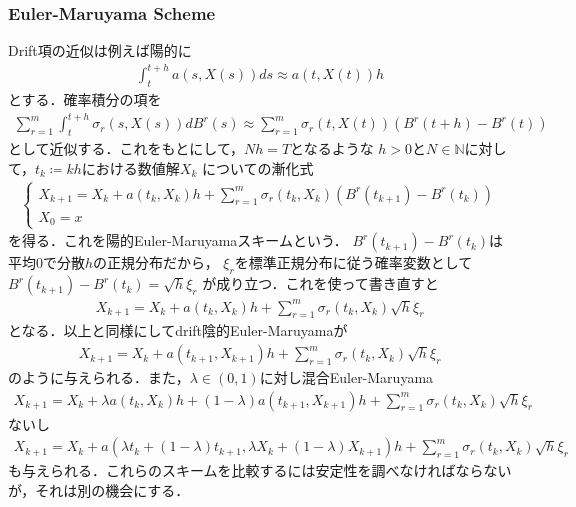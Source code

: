 \documentclass[dvipdfmx,autodetect-engine]{jsarticle}
\theoremstyle{remark}
\theoremstyle{definition}
\newcommand{\N}{\mathbb{N}}
\begin{document}
\subsubsection{Euler-Maruyama Scheme}
Drift項の近似は例えば陽的に
\begin{align}
    \int_{t}^{t+h} a(s,X(s))ds \approx a(t,X(t))h
\end{align}
とする．確率積分の項を
\begin{align}
    \sum_{r=1}^{m} \int_{t}^{t+h} \sigma_{r}(s,X(s))dB^{r}(s)
    \approx \sum_{r=1}^{m} \sigma_{r}(t,X(t)) (B^{r}(t+h) - B^{r}(t))
\end{align}
として近似する．これをもとにして，$Nh = T$となるような
$h>0$と$N \in \N$に対して，$t_{k}\coloneqq  kh$における数値解$X_{k}$
についての漸化式
\begin{align}
    \begin{cases}
        X_{k+1} = X_{k} + a(t_{k},X_{k})h 
        + \sum_{r=1}^{m} \sigma_{r}(t_{k},X_{k}) (B^{r}(t_{k+1}) - B^{r}(t_{k}))\\
        X_{0} = x
    \end{cases}
\end{align}
を得る．これを陽的Euler-Maruyamaスキームという．
$B^{r}(t_{k+1}) - B^{r}(t_{k})$は平均$0$で分散$h$の正規分布だから，
$\xi_{r}$を標準正規分布に従う確率変数として$B^{r}(t_{k+1}) - B^{r}(t_{k}) = \sqrt{h} \xi_{r}$
が成り立つ．これを使って書き直すと
\begin{align}
    X_{k+1} = X_{k} + a(t_{k},X_{k})h 
    + \sum_{r=1}^{m} \sigma_{r}(t_{k},X_{k}) \sqrt{h} \xi_{r} \label{Euler_Maruyama}
\end{align}
となる．以上と同様にしてdrift陰的Euler-Maruyamaが
\begin{align}
    X_{k+1} = X_{k} + a(t_{k+1},X_{k+1})h 
    + \sum_{r=1}^{m} \sigma_{r}(t_{k},X_{k}) \sqrt{h} \xi_{r}
\end{align}
のように与えられる．また，$\lambda \in (0,1)$に対し混合Euler-Maruyama
\begin{align}
    X_{k+1} = X_{k} + \lambda a(t_{k},X_{k})h + (1-\lambda) a(t_{k+1},X_{k+1})h 
    + \sum_{r=1}^{m} \sigma_{r}(t_{k},X_{k}) \sqrt{h} \xi_{r}
\end{align}
ないし
\begin{align}
    X_{k+1} = X_{k} + a(\lambda t_k + (1-\lambda)t_{k+1}, \lambda X_{k} + (1-\lambda)X_{k+1})h
    + \sum_{r=1}^{m} \sigma_{r}(t_{k},X_{k}) \sqrt{h} \xi_{r}
\end{align}
も与えられる．これらのスキームを比較するには安定性を調べなければならないが，それは別の機会にする．
\end{document}
